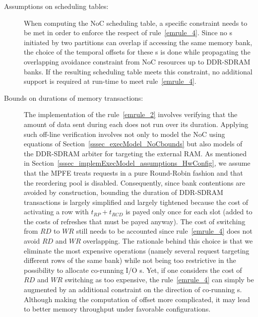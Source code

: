 \documentclass[main.tex]{subfiles}
\begin{document}
\begin{description}
    \item[Assumptions on scheduling tables: ] 
        When computing the NoC scheduling table, a specific constraint needs to
        be met in order to enforce the respect of rule~\ref{emrule_4}. Since no
        \PC{}s initiated by two partitions can overlap if accessing the same
        memory bank, the choice of the temporal offsets for these \PC{}s is
        done while propagating the overlapping avoidance constraint from NoC
        resources up to DDR-SDRAM banks. If the resulting scheduling table
        meets this constraint, no additional support is required at run-time to
        meet rule~\ref{emrule_4}.
    \item[Bounds on durations of memory transactions: ] The implementation of
        the rule~\ref{emrule_2} involves verifying that the amount of data sent
        during each \PC{} does not run over its duration. Applying such
        off-line verification involves not only to model the NoC using
        equations of Section~\ref{sssec_execModel_NoCbounds} but also models of
        the DDR-SDRAM arbiter for \PC{} targeting the external RAM. As
        mentioned in Section~\ref{sssec_implemExecModel_assumptions_HwConfig},
        we assume that the MPFE treats requests in a pure Round-Robin fashion
        and that the reordering pool is disabled. Consequently, since bank
        contentions are avoided by construction, bounding the duration of
        DDR-SDRAM transactions is largely simplified and largely tightened
        because the cost of activating a row with $t_{RP} + t_{RCD}$ is payed
        only once for each \PC{} slot (added to the costs of refreshes that
        must be payed anyway). The cost of switching from $RD$ to $WR$ still
        needs to be accounted since rule~\ref{emrule_4} does not avoid $RD$ and
        $WR$ overlapping. The rationale behind this choice is that we eliminate
        the most expensive operations (namely several request targeting
        different rows of the same bank) while not being too restrictive in the
        possibility to allocate co-running I/O \PC{}s. Yet, if one considers
        the cost of $RD$ and $WR$ switching as too expensive, the
        rule~\ref{emrule_4} can simply be augmented by an additional constraint
        on the direction of co-running \PC{}s. Although making the computation
        of \PC{} offset more complicated, it may lead to better memory
        throughput under favorable configurations. 
\end{description}
\end{document}
